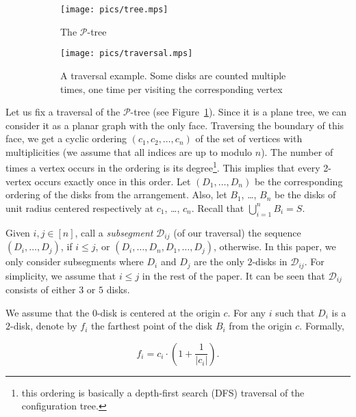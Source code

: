 \begin{figure}[h!]
    \centering
    \begin{subfigure}[t]{.48\textwidth}
    \texttt{[image: pics/tree.mps]}
    \caption{The $\mathcal{P}$-tree}
    \end{subfigure}
    \begin{subfigure}[t]{.48\textwidth}
    \texttt{[image: pics/traversal.mps]}
    \caption{A traversal example. Some disks are counted multiple times, one time per visiting the corresponding vertex}
    \end{subfigure}
    \caption{}
    \label{fig:tree}
\end{figure}

Let us fix a traversal of the $\mathcal{P}$-tree (see Figure~\ref{fig:tree}). 
Since it is a plane tree, we can consider it as a planar graph with the only face. Traversing the boundary of this face, we get a cyclic ordering $(c_1, c_2, \ldots, c_n)$ of the set of vertices with multiplicities (we assume that all indices are up to modulo $n$). The number of times a vertex occurs in the ordering is its degree\footnote{this ordering is basically a depth-first search (DFS) traversal of the configuration tree.}.
This implies that every 2-vertex occurs exactly once in this order.
Let $(D_1, \ldots, D_n)$ be the corresponding ordering of the disks from the arrangement. %
Also, let $B_1$, \ldots, $B_n$ be the disks of unit radius centered respectively at $c_1$, \ldots, $c_n$. %
Recall that $\bigcup_{i=1}^nB_i = S$.

Given $i,j\in[n]$, call a \textit{subsegment} $\mathcal{D}_{ij}$ (of our traversal) the sequence $(D_i, \ldots, D_j)$, if $i \leq j$, or $(D_i, \ldots, D_n, D_1, \ldots, D_j)$, otherwise. In this paper, we only consider subsegments where $D_i$ and $D_j$ are the only $2$-disks in $\mathcal{D}_{ij}$. For simplicity, we assume that $i\leq j$ in the rest of the paper. It can be seen that $\mathcal{D}_{ij}$ consists of either $3$ or $5$ disks.

We assume that the $0$-disk is centered at the origin $c$. For any $i$ such that $D_i$ is a $2$-disk, denote by $f_i$ the farthest point of the disk $B_i$ from the origin $c$.
Formally,

$$f_i = c_i\cdot\left(1 + \frac{1}{|c_i|}\right).$$

